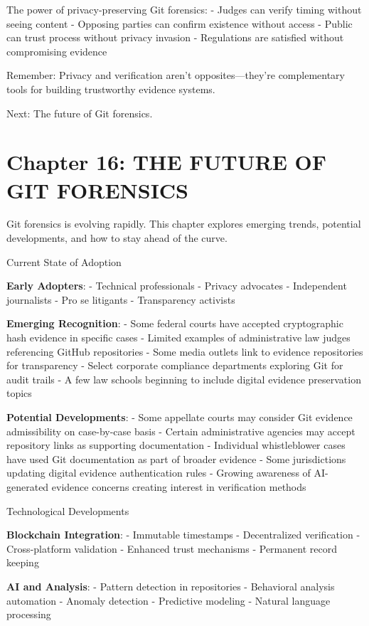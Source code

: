 The power of privacy-preserving Git forensics: - Judges can verify
timing without seeing content - Opposing parties can confirm existence
without access - Public can trust process without privacy invasion -
Regulations are satisfied without compromising evidence

Remember: Privacy and verification aren't opposites---they're
complementary tools for building trustworthy evidence systems.

Next: The future of Git forensics.

\section{Chapter 16: THE FUTURE OF GIT
FORENSICS}\label{chapter-16-the-future-of-git-forensics}

Git forensics is evolving rapidly. This chapter explores emerging
trends, potential developments, and how to stay ahead of the curve.

Current State of Adoption

\textbf{Early Adopters}: - Technical professionals - Privacy advocates -
Independent journalists - Pro se litigants - Transparency activists

\textbf{Emerging Recognition}: - Some federal courts have accepted
cryptographic hash evidence in specific cases - Limited examples of
administrative law judges referencing GitHub repositories - Some media
outlets link to evidence repositories for transparency - Select
corporate compliance departments exploring Git for audit trails - A few
law schools beginning to include digital evidence preservation topics

\textbf{Potential Developments}: - Some appellate courts may consider
Git evidence admissibility on case-by-case basis - Certain
administrative agencies may accept repository links as supporting
documentation - Individual whistleblower cases have used Git
documentation as part of broader evidence - Some jurisdictions updating
digital evidence authentication rules - Growing awareness of
AI-generated evidence concerns creating interest in verification methods

Technological Developments

\textbf{Blockchain Integration}: - Immutable timestamps - Decentralized
verification - Cross-platform validation - Enhanced trust mechanisms -
Permanent record keeping

\textbf{AI and Analysis}: - Pattern detection in repositories -
Behavioral analysis automation - Anomaly detection - Predictive modeling
- Natural language processing

